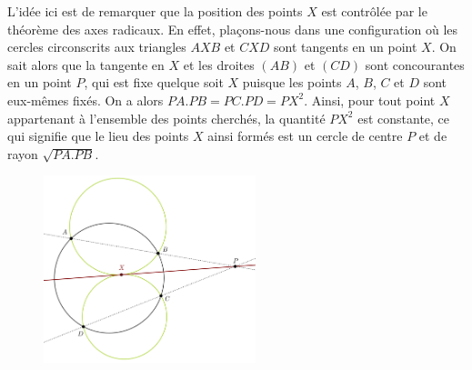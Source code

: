 \begin{sol}
L'idée ici est de remarquer que la position des points $X$ est contrôlée par le théorème des axes radicaux. En effet, plaçons-nous dans une configuration où les cercles circonscrits aux triangles $AXB$ et $CXD$ sont tangents en un point $X$. On sait alors que la tangente en $X$ et les droites $(AB)$ et $(CD)$ sont concourantes en un point $P$, qui est fixe quelque soit $X$ puisque les points $A$, $B$, $C$ et $D$ sont eux-mêmes fixés. On a alors $PA.PB = PC.PD = PX^2$. Ainsi, pour tout point $X$ appartenant à l'ensemble des points cherchés, la quantité $PX^2$ est constante, ce qui signifie que le lieu des points $X$ ainsi formés est un cercle de centre $P$ et de rayon $\sqrt{PA.PB}$.

\begin{figure}[!h]
\centerline{\includegraphics[width=0.55\textwidth]{lieu}}
\end{figure}
\end{sol}